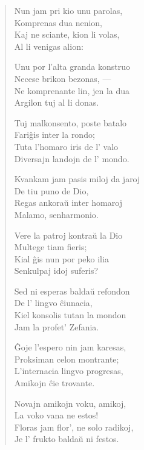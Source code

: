 \begin{verse}
                     Nun jam pri kio unu parolas,\\
                    \vin    Komprenas dua nenion,\\
                     Kaj ne sciante, kion li volas,\\
                     \vin   Al li venigas alion:

                     Unu por l'alta granda konstruo\\
                    \vin    Necese brikon bezonas, ---\\
                     Ne komprenante lin, jen la dua\\
                    \vin    Argilon tuj al li donas.

                     Tuj malkonsento, poste batalo\\
                    \vin    Fari\^gis inter la rondo;\\
                     Tuta l'homaro iris de l' valo\\
                    \vin    Diversajn landojn de l' mondo.

                     Kvankam jam pasis miloj da jaroj\\
                     \vin   De tiu puno de Dio,\\
                     Regas ankora\u u inter homaroj\\
                     \vin   Malamo, senharmonio.

                     Vere la patroj kontra\u u la Dio\\
                     \vin   Multege tiam fieris;\\
                     Kial \^gis nun por peko ilia\\
                     \vin   Senkulpaj idoj suferis?

                     Sed ni esperas balda\u u refondon\\
                    \vin    De l' lingvo \^ciunacia,\\
                     Kiel konsolis tutan la mondon\\
                     \vin   Jam la profet' Zefania.

                     \^Goje l'espero nin jam karesas,\\
                     \vin   Proksiman celon montrante;\\
                     L'internacia lingvo progresas,\\
                     \vin   Amikojn \^cie trovante.

                     Novajn amikojn voku, amikoj,\\
                     \vin   La voko vana ne estos!\\
                     Floras jam flor', ne solo radikoj,\\
                     \vin   Je l' frukto balda\u u ni festos.

\end{verse}


\smallrule{}
